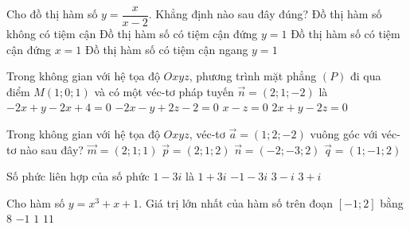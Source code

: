 \begin{ex}%
Cho đồ thị hàm số $y=\dfrac{x}{x-2}$. Khẳng định nào sau đây đúng?
\choice
{Đồ thị hàm số không có tiệm cận}
{Đồ thị hàm số có tiệm cận đứng $y=1$}
{Đồ thị hàm số có tiệm cận đứng $x=1$}
{\True Đồ thị hàm số có tiệm cận ngang $y=1$}
\end{ex}


\begin{ex}%
Trong không gian với hệ tọa độ $Oxyz$, phương trình mặt phẳng $(P)$ đi qua điểm $M\left(1;0;1\right)$ và có một  véc-tơ pháp tuyến $\overrightarrow{n}=\left(2;1;-2\right)$ là
\choice
{$-2x+y-2x+4=0$}
{$-2x-y+2z-2=0$}
{$x-z=0$}
{\True $2x+y-2z=0$}
\end{ex}


\begin{ex}%
Trong không gian với hệ tọa độ $Oxyz$, véc-tơ $\overrightarrow{a}=(1;2;-2)$ vuông góc với véc-tơ nào sau đây?
\choice
{$\overrightarrow{m}=(2;1;1)$}
{\True $\overrightarrow{p}=(2;1;2)$}
{$\overrightarrow{n}=(-2;-3;2)$}
{$\overrightarrow{q}=(1;-1;2)$}
\end{ex}


\begin{ex}%
Số phức liên hợp của số phức $1-3i$ là
\choice
{\True $1+3i$}
{$-1-3i$}
{$3-i$}
{$3+i$}
\end{ex}


\begin{ex}%
Cho hàm số $y=x^3+x+1$. Giá trị lớn nhất của hàm số trên đoạn $[-1;2]$ bằng 
\choice
{$8$}
{$-1$}
{$1$}
{\True $11$}
\end{ex}


